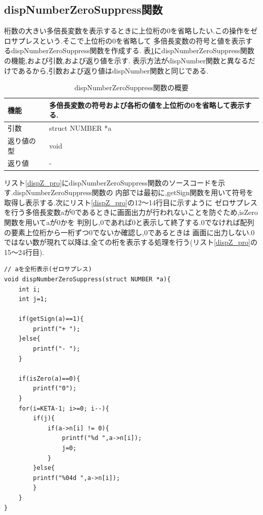 \documentclass[a4j] {jarticle}
\begin{document}
\subsection{dispNumberZeroSuppress関数}
桁数の大きい多倍長変数を表示するときに上位桁の0を省略したい.この操作をゼロサプレスという.そこで上位桁の0を省略して
多倍長変数の符号と値を表示するdispNumberZeroSuppress関数を作成する.
表\ref{dispNumberZeroSuppress}にdispNumberZeroSuppress関数の機能,および引数,および返り値を示す.
表示方法がdispNumber関数と異なるだけであるから,引数および返り値はdispNumber関数と同じである.
\begin{table}[H]
  \caption{dispNumberZeroSuppress関数の概要}
  \label{dispNumberZeroSuppress}
  \begin{center}
      \begin{tabular}{|l|l|}\hline
      機能 & 多倍長変数の符号および各桁の値を上位桁の0を省略して表示する.\\ \hline
      引数 & struct NUMBER *a\\ \hline
      返り値の型 & void\\ \hline
      返り値 & -\\ \hline
      \end{tabular}
  \end{center}
  \end{table}

  リスト\ref{dispZ_pro}にdispNumberZeroSuppress関数のソースコードを示す.dispNumberZeroSuppress関数の
  内部では最初に,getSign関数を用いて符号を取得し表示する.次にリスト\ref{dispZ_pro}の12～14行目に示すように
  ゼロサプレスを行う多倍長変数aが0であるときに画面出力が行われないことを防ぐため,isZero関数を用いてaが0かを
  判別し,0であれば0と表示して終了する.0でなければ配列の要素上位桁から一桁ずつ0でないか確認し,0であるときは
  画面に出力しない.0ではない数が現れて以降は,全ての桁を表示する処理を行う(リスト\ref{dispZ_pro}の15～24行目).
  \begin{lstlisting}[basicstyle=\ttfamily\footnotesize, frame=single,label=dispZ_pro,caption=dispNumberZeroSuppress関数のソースコード]
// aを全桁表示(ゼロサプレス)
void dispNumberZeroSuppress(struct NUMBER *a){
    int i;
    int j=1;

    if(getSign(a)==1){
        printf("+ ");
    }else{
        printf("- ");
    }

    if(isZero(a)==0){
        printf("0");
    }
    for(i=KETA-1; i>=0; i--){
        if(j){
            if(a->n[i] != 0){
                printf("%d ",a->n[i]);
                j=0;
            }
        }else{
        printf("%04d ",a->n[i]);
        }
    }
}
  \end{lstlisting}
\end{document}
